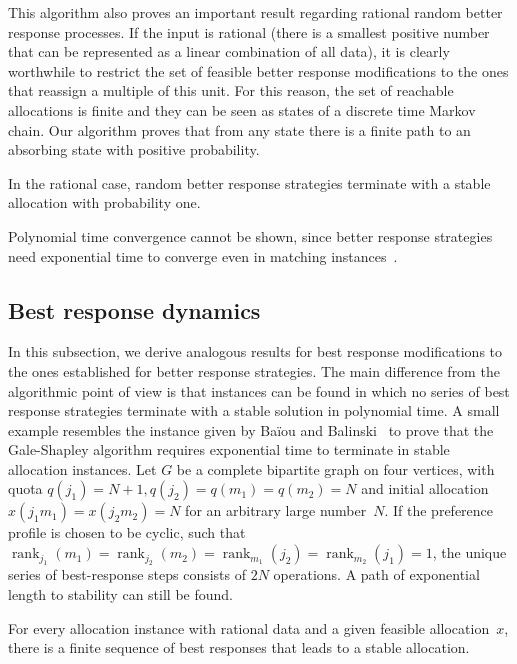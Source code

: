 \documentclass{llncs}
\DeclareMathOperator{\rank}{rank}
\begin{document}
This algorithm also proves an important result regarding rational random better response processes. If the input is rational (there is a smallest positive number that can be represented as a linear combination of all data), it is clearly worthwhile to restrict the set of feasible better response modifications to the ones that reassign a multiple of this unit. For this reason, the set of reachable allocations is finite and they can be seen as states of a discrete time Markov chain. Our algorithm proves that from any state there is a finite path to an absorbing state with positive probability.

\begin{theorem}
\label{th_random_better}
	In the rational case, random better response strategies terminate with a stable allocation with probability one.
\end{theorem}

Polynomial time convergence cannot be shown, since better response strategies need exponential time to converge even in matching instances~\cite{ackermann2011uncoordinated}.

\subsection{Best response dynamics}

In this subsection, we derive analogous results for best response modifications to the ones established for better response strategies. The main difference from the algorithmic point of view is that instances can be found in which no series of best response strategies terminate with a stable solution in polynomial time. A small example resembles the instance given by Ba\"iou and Balinski~\cite{DBLP:journals/mor/BaiouB02} to prove that the Gale-Shapley algorithm requires exponential time to terminate in stable allocation instances. Let $G$ be a complete bipartite graph on four vertices, with quota $q(j_1)=N+1, q(j_2)=q(m_1)=q(m_2)=N$ and initial allocation $x(j_1m_1) = x(j_2m_2) = N$ for an arbitrary large number~$N$. If the preference profile is chosen to be cyclic, such that $\rank_{j_1}(m_1) = \rank_{j_2}(m_2) = \rank_{m_1}(j_2) = \rank_{m_2}(j_1) = 1$, the unique series of best-response steps consists of $2N$ operations. A path of exponential length to stability can still be found. 


\begin{theorem}
\label{th:best_rat}
	For every allocation instance with rational data and a given feasible allocation~$x$, there is a finite sequence of best responses that leads to a stable allocation.
\end{theorem}
\end{document}
